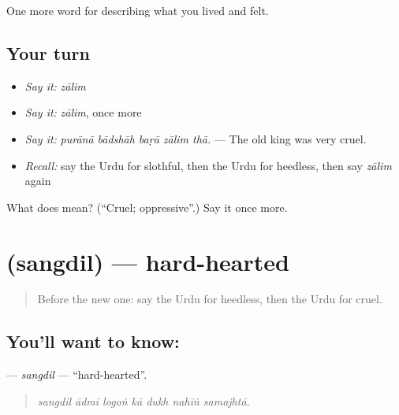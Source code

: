 \begin{grammarlens}[title={What you've built}]
One more word for describing what you lived and felt.
\end{grammarlens}

\subsection*{Your turn}
\begin{itemize}
\raggedright
  \item \emph{Say it:} \emph{zālim}
  \item \emph{Say it:} \emph{zālim}, once more
  \item \emph{Say it:} \emph{purānā bādshāh baṛā zālim thā.} — The old king was very cruel.
  \item \emph{Recall:} say the Urdu for slothful, then the Urdu for heedless, then say \emph{zālim} again
\end{itemize}

\begin{tcolorbox}[breakable,colback=teal!4,colframe=teal!35!black,title={Before you move on}]
What does  mean? (\textquotedblleft{}Cruel; oppressive\textquotedblright{}.) Say it once more.
\end{tcolorbox}
\section[\texorpdfstring{\ur{سنگدل} (sangdil)}{سنگدل (sangdil)}]{ (sangdil) — hard-hearted}

\label{lesson:UR-C456-sangdil}



\begin{quote}
Before the new one: say the Urdu for heedless, then the Urdu for cruel.
\end{quote}

\subsection*{You'll want to know: }
\textbf{} — \emph{sangdil} — \textquotedblleft{}hard-hearted\textquotedblright{}.

\begin{quote}
      
\end{quote}

\begin{quote}
\emph{sangdil ādmī logoṅ kā dukh nahīṅ samajhtā.}
\end{quote}

